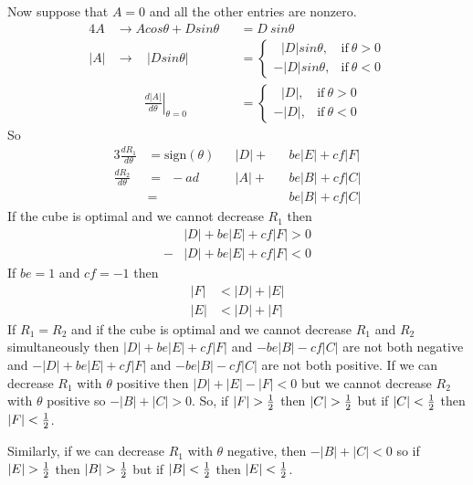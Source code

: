 Now suppose that $A = 0$ and all the other entries are nonzero.
\begin{alignat*}{4}
 A  &\rightarrow A cos\theta + D sin\theta &&= D~ sin\theta \\
|A| &\rightarrow ~~~~|D sin\theta|         &&=
\begin{cases}
    ~\:\,|D| sin\theta,& \text{if}~\theta > 0 \\
     -|D| sin\theta,& \text{if}~\theta < 0
\end{cases} \\
    & ~~~~~~~~~~\left.\frac{d|A|}{d\theta}\right|_{\theta=0} &&=
\begin{cases}
    ~\:\,|D|,& \text{if}~\theta > 0 \\
        -|D|,& \text{if}~\theta < 0 
\end{cases}
\end{alignat*}
So
\begin{alignat*}{3}
\frac{dR_1}{d\theta} &= \text{sign}(\theta)&&|D| + &&be|E| + cf|F| \\
\frac{dR_2}{d\theta} &=    ~~           -ad&&|A| + &&be|B| + cf|C| \\
                     &=                    &&      &&be|B| + cf|C|
\end{alignat*}
If the cube is optimal and we cannot decrease $R_1$ then
\begin{align*}
 &|D|+be|E|+cf|F| > 0 \\
-&|D|+be|E|+cf|F| < 0
\end{align*}
If $be = 1$ and $cf = -1$ then
\begin{align*}
 |F| &< |D|+|E| \\
 |E| &< |D|+|F|
\end{align*}
If $R_1 = R_2$ and if the cube is optimal and we cannot decrease $R_1$ and
$R_2$ simultaneously then $|D|+be|E|+cf|F|$ and $-be|B|-cf|C|$ are not both
negative and $-|D|+be|E|+cf|F|$ and $-be|B|-cf|C|$ are not both positive.
If we can decrease $R_1$ with $\theta$ positive then $|D|+|E|-|F| < 0$ but we
cannot decrease $R_2$ with $\theta$ positive so $-|B|+|C|>0$.  So, if $|F| >
\frac{1}{2}$ then $|C| > \frac{1}{2}$ but if $|C| < \frac{1}{2}$ then $|F| <
\frac{1}{2}$.

Similarly, if we can decrease $R_1$ with $\theta$ negative, then $-|B|+|C| <
0$ so if $|E| > \frac{1}{2}$ then $|B| > \frac{1}{2}$ but if $|B| <
\frac{1}{2}$ then $|E| < \frac{1}{2}$.

